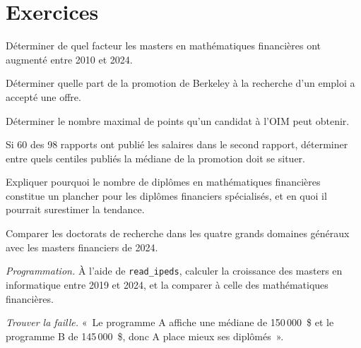 \section{Exercices}

\begin{exercise}[$\star$]\label{exo:in:education-pipelines:1}
Déterminer de quel facteur les masters en mathématiques financières ont augmenté entre 2010 et 2024.
\end{exercise}

\begin{exercise}[$\star$]\label{exo:in:education-pipelines:2}
Déterminer quelle part de la promotion de Berkeley à la recherche d'un emploi a accepté une offre.
\end{exercise}

\begin{exercise}[$\star$]\label{exo:in:education-pipelines:3}
Déterminer le nombre maximal de points qu'un candidat à l'OIM peut obtenir.
\end{exercise}

\begin{exercise}[$\star\star$]\label{exo:in:education-pipelines:4}
Si 60 des 98 rapports ont publié les salaires dans le second rapport, déterminer entre quels centiles publiés la médiane de la promotion doit se situer.
\end{exercise}

\begin{exercise}[$\star\star$]\label{exo:in:education-pipelines:5}
Expliquer pourquoi le nombre de diplômes en mathématiques financières constitue un plancher pour les diplômes financiers spécialisés, et en quoi il pourrait
surestimer la tendance.
\end{exercise}

\begin{exercise}[$\star\star$]\label{exo:in:education-pipelines:6}
Comparer les doctorats de recherche dans les quatre grands domaines généraux avec les masters financiers de 2024.
\end{exercise}

\begin{exercise}[$\star\star\star$]\label{exo:in:education-pipelines:7}
\emph{Programmation.} À l'aide de \texttt{read\_ipeds}, calculer la croissance des masters en informatique entre 2019 et 2024,
et la comparer à celle des mathématiques financières.
\end{exercise}

\begin{exercise}[$\star\star\star$]\label{exo:in:education-pipelines:8}
\emph{Trouver la faille.} «~Le programme A affiche une médiane de 150\,000~\$ et le programme B de 145\,000~\$, donc A place
mieux ses diplômés~».
\end{exercise}

